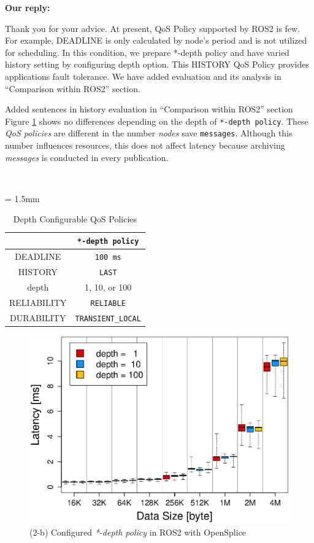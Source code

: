 \documentclass{article}
\begin{document}
\begin{enumerate}
  \begin{flushleft}
    \textbf{Our reply:}
  \end{flushleft}
  Thank you for your advice.
  At present, QoS Policy supported by ROS2 is few.
  For example, DEADLINE is only calculated by node's period and is not utilized for scheduling.
  In this condition, we prepare *-depth policy and have varied history setting by configuring depth option.
  This HISTORY QoS Policy provides applications fault tolerance.
  We have added evaluation and its analysis in ``Comparison within ROS2'' section.
  \begin{itembox}[|]{Added sentences in history evaluation in ``Comparison within ROS2'' section}
    Figure \ref{fig:depth_boxplot} shows no differences depending on the depth of \texttt{*-depth policy}.
    These \emph{QoS policies} are different in the number \emph{nodes} save \texttt{messages}.
    Although this number influences resources, this does not affect latency because archiving \emph{messages} is conducted in every publication.
  \end{itembox}\\
  \renewcommand{\arraystretch}{1.0}
  \begin{table}[H]
    \caption{\label{tb:depth_qos}Depth Configurable QoS Policies}
    \centering
    \tabcolsep = 1.5mm              %
    \begin{tabular}{c|c}
      \hline
      & \textbf{\texttt{*-depth policy} }\\
      \hline
      \hline
      DEADLINE & \texttt{100 ms}\\
      HISTORY & \texttt{LAST}\\
      depth & 1, 10, or 100\\
      RELIABILITY & \texttt{RELIABLE}\\
      DURABILITY & \texttt{TRANSIENT\_LOCAL}\\
      \hline
    \end{tabular}
  \end{table}
  \setcounter{figure}{15}
  \begin{figure}[H]
    \centering
    \includegraphics[width=0.6\linewidth]{../../figure/BoxPlot_ospl_QoS_depth.eps}
    \caption{(2-b) Configured \emph{*-depth policy} in ROS2 with OpenSplice}
    \label{fig:depth_boxplot}
  \end{figure}


\end{enumerate}
\end{document}
